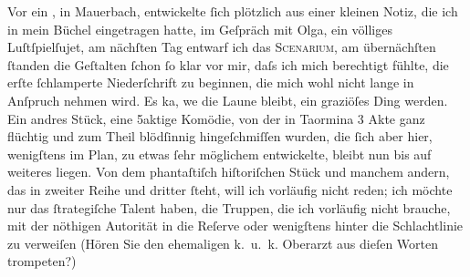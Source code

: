\pstart
           Vor ein \label{K_L01422-2v}\label{K_L01422-2}, in Mauerbach, entwickelte{ }ſich plötzlich
               aus einer kleinen Notiz, die ich in mein Büchel eingetragen hatte, im Geſpräch mit
                  Olga, ein völliges Luſtſpielſujet, am nächſten Tag ent{\pb}warf ich das \textsc{Scenarium}, am
               übernächſten{ }ſtanden die Geſtalten{ }ſchon{ }ſo klar vor mir, daſs ich mich berechtigt
               fühlte, die erſte{ }ſchlamperte Niederſchrift zu beginnen, die mich wohl nicht lange in
               Anſpruch nehmen wird. Es ka{\geminationn}, we{\geminationn} die Laune bleibt, ein graziöſes Ding werden. Ein
               andres Stück, eine 5aktige
                  Komödie, von der in Taormina 3 Akte ganz
               flüchtig und zum Theil blödſinnig hingeſchmiſſen wurden, die{ }ſich aber hier,
               wenigſtens im Plan, zu etwas{ }ſehr möglichem entwickelte, {\pb}bleibt nun bis auf weiteres liegen. Von dem phantaſtiſch hiſtoriſchen Stück und manchem andern, das
               in zweiter Reihe und dritter{ }ſteht, will ich vorläufig nicht reden; ich möchte nur
               das{ }ſtrategiſche Talent haben, die Truppen, die ich vorläufig nicht brauche, mit der
               nöthigen Autorität in die Reſerve oder wenigſtens hinter die Schlachtlinie zu
               verweiſen (Hören Sie den ehemaligen k. u. k. Oberarzt aus dieſen Worten trompeten?)
